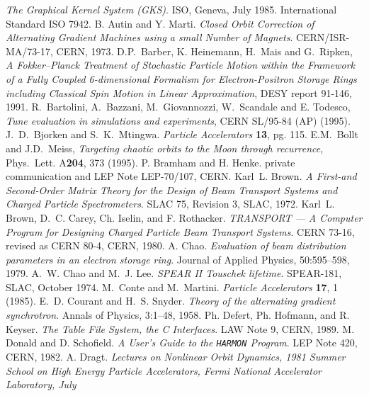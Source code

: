 \begin{thebibliography}{10}
{\sl The Graphical Kernel System (GKS)}.
ISO, Geneva, July 1985.
International Standard ISO 7942.
B. Autin and Y. Marti.
{\sl Closed Orbit Correction of Alternating Gradient Machines
  using a small Number of Magnets}.
CERN/ISR-MA/73-17, CERN, 1973.
D.P.~Barber, K. Heinemann, H.~Mais and G.~Ripken,
  {\sl A Fokker--Planck Treatment of Stochastic Particle Motion within
    the Framework of a Fully Coupled 6-dimensional Formalism for
    Electron-Positron Storage Rings including Classical Spin Motion in
    Linear Approximation}, 
DESY report 91-146, 1991.
R.~Bartolini, A.~Bazzani, M.~Giovannozzi, W.~Scandale and E. Todesco, 
{\sl Tune evaluation in simulations and experiments}, 
CERN SL/95-84 (AP) (1995).
J.~D.~Bjorken and S.~K.~Mtingwa.
{\sl Particle Accelerators} {\bf 13}, pg. 115.
E.M.~Bollt and J.D.~Meiss, 
{\sl Targeting chaotic orbits to the Moon through recurrence}, 
Phys.~Lett. A{\bf 204}, 373 (1995).
P. Bramham and H. Henke.
private communication and LEP Note LEP-70/107, CERN.
Karl~L. Brown.
{\sl A First-and Second-Order Matrix Theory for the Design
  of Beam Transport Systems and Charged Particle Spectrometers}.
SLAC 75, Revision 3, SLAC, 1972.
Karl~L. Brown, D.~C. Carey, Ch. Iselin, and F. Rothacker.
{\sl TRANSPORT --- A Computer Program for Designing Charged
  Particle Beam Transport Systems}.
CERN 73-16, revised as CERN 80-4, CERN, 1980.
A. Chao.
{\sl Evaluation of beam distribution parameters in an electron
  storage ring}.
Journal of Applied Physics, 50:595--598, 1979.
A.~W. Chao and M.~J. Lee.
{\sl SPEAR II Touschek lifetime}.
SPEAR-181, SLAC, October 1974.
M.~Conte and M.~Martini.
{\sl Particle Accelerators} {\bf 17}, 1 (1985).
E.~D. Courant and H.~S. Snyder.
{\sl Theory of the alternating gradient synchrotron}.
Annals of Physics, 3:1--48, 1958.
Ph. Defert, Ph. Hofmann, and R. Keyser.
{\sl The Table File System, the C Interfaces}.
LAW Note 9, CERN, 1989.
M. Donald and D. Schofield.
{\sl A User's Guide to the {\tt HARMON} Program}.
LEP Note 420, CERN, 1982.
A. Dragt.
{\sl Lectures on Nonlinear Orbit Dynamics, 1981 Summer School on High
  Energy Particle Accelerators, Fermi National Accelerator Laboratory, July
}
\end{thebibliography}
